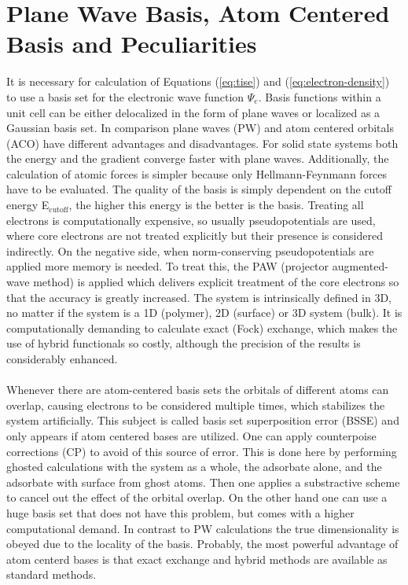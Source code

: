 \documentclass[11pt,DIV=13,BCOR=5mm,a4paper,headinclude]{scrbook}
\begin{document}
\section{Plane Wave Basis, Atom Centered Basis and Peculiarities}
It is necessary for calculation of Equations (\ref{eq:tise}) and (\ref{eq:electron-density}) to use a basis set for the electronic wave function $\Psi_e$.
Basis functions within a unit cell can be either delocalized in the form of plane waves or localized as a Gaussian basis set.
In comparison plane waves (PW) and atom centered orbitals (ACO) have different advantages and disadvantages\cite{Tosoni2007}.
For solid state systems both the energy and the gradient converge faster with plane waves.
Additionally, the calculation of atomic forces is simpler because only Hellmann-Feynmann forces have to be evaluated.
The quality of the basis is simply dependent on the cutoff energy E$_\textrm{cutoff}$, the higher this energy is the better is the basis.
Treating all electrons is computationally expensive, so usually pseudopotentials are used, where core electrons are not treated explicitly but their presence is considered indirectly.
On the negative side, when norm-conserving pseudopotentials are applied more memory is needed.
To treat this, the PAW (projector augmented-wave method)\cite{paw1,Kresse1999} is applied which delivers explicit treatment of the core electrons so that the accuracy is greatly increased.
The system is intrinsically defined in 3D, no matter if the system is a 1D (polymer), 2D (surface) or 3D system (bulk).
It is computationally demanding to calculate exact (Fock) exchange, which makes the use of hybrid functionals so costly, although the precision of the results is considerably enhanced.
\\\\
Whenever there are atom-centered basis sets the orbitals of different atoms can overlap, causing electrons to be considered multiple times, which stabilizes the system artificially.
This subject is called basis set superposition error (BSSE) and only appears if atom centered bases are utilized.
One can apply counterpoise corrections (CP)\cite{Boys1970} to avoid of this source of error.
This is done here by performing ghosted calculations with the system as a whole, the adsorbate alone, and the adsorbate with surface from ghost atoms.
Then one applies a substractive scheme to cancel out the effect of the orbital overlap.
On the other hand one can use a huge basis set that does not have this problem, but comes with a higher computational demand.
In contrast to PW calculations the true dimensionality is obeyed due to the locality of the basis.
Probably, the most powerful advantage of atom centerd bases is that exact exchange and hybrid methods are available as standard methods.
\end{document}
